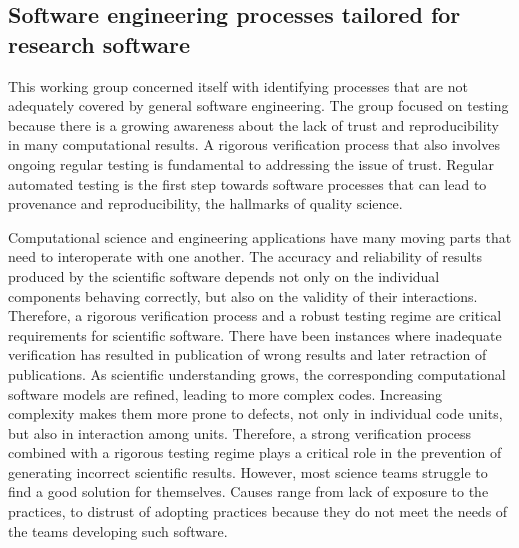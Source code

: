 \subsection{Software engineering processes tailored for research software}
\label{sec:soft-eng}


This working group concerned itself with identifying processes that are not adequately
covered by general software engineering. The group focused
on testing because there is a growing awareness about the lack of trust
and reproducibility in many computational results. A rigorous
verification process that also involves ongoing regular testing is
fundamental to addressing the issue of trust. Regular automated
testing is the first step towards software processes that can lead to
provenance and reproducibility, the hallmarks of quality science.

Computational science and engineering applications have many moving
parts that need to interoperate with one another. The accuracy and
reliability of results produced by the scientific software depends not
only on the individual components behaving correctly, but also on the
validity of their interactions. Therefore, a rigorous verification
process and a robust testing regime are critical requirements for
scientific software.  There have been instances where inadequate
verification has resulted in publication of wrong results and later
retraction of publications. As scientific understanding grows,
the corresponding computational software models are refined, leading
to more complex codes. Increasing complexity makes them more prone to
defects, not only in individual code units, but also in interaction
among units. Therefore, a strong verification process combined with a
rigorous testing regime plays a critical role in the prevention of
generating incorrect scientific results. However, most science teams
struggle to find a good solution for themselves. Causes range from
lack of exposure to the practices, to distrust of adopting practices
because they do not meet the needs of the teams developing such
software.  

